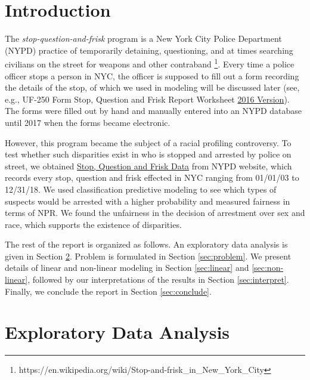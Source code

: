 


\section{Introduction}



The \textit{stop-question-and-frisk} program is a New York City Police Department (NYPD) practice of temporarily detaining, questioning, and at times searching civilians on the street for weapons and other contraband \footnote{https://en.wikipedia.org/wiki/Stop-and-frisk\_in\_New\_York\_City}. 
Every time a police officer stops a person in NYC, the officer is supposed to fill out a form recording the details of the stop, of which we used in modeling will be discussed later (see, e.g., UF-250 Form Stop, Question and Frisk Report Worksheet \href{https://www.prisonlegalnews.org/news/publications/blank-uf-250-form-stop-question-and-frisk-report-worksheet-nypd-2016/}{2016 Version}). The forms were filled out by hand and manually entered into an NYPD database until 2017 when the forms became electronic.

However, this program became the subject of a racial profiling controversy. To test whether such disparities exist in who is stopped and arrested by police on street, we obtained \href{https://www1.nyc.gov/site/nypd/stats/reports-analysis/stopfrisk.page}{Stop, Question and Frisk Data} from NYPD website, which records every stop, question and frisk effected in NYC ranging from 01/01/03 to 12/31/18. We used classification predictive modeling to see which types of suspects would be arrested with a higher probability and measured fairness in terms of NPR. %
We found the unfairness in the decision of arrestment over sex and race, which supports the existence of disparities.

The rest of the report is organized as follows. An exploratory data analysis is given in Section \ref{sec:eda}. Problem is formulated in Section \ref{sec:problem}. We present details of linear and non-linear modeling in Section \ref{sec:linear} and \ref{sec:non-linear}, followed by our interpretations of the results in Section \ref{sec:interpret}. Finally, we conclude the report in Section \ref{sec:conclude}.

\section{Exploratory Data Analysis} \label{sec:eda}
